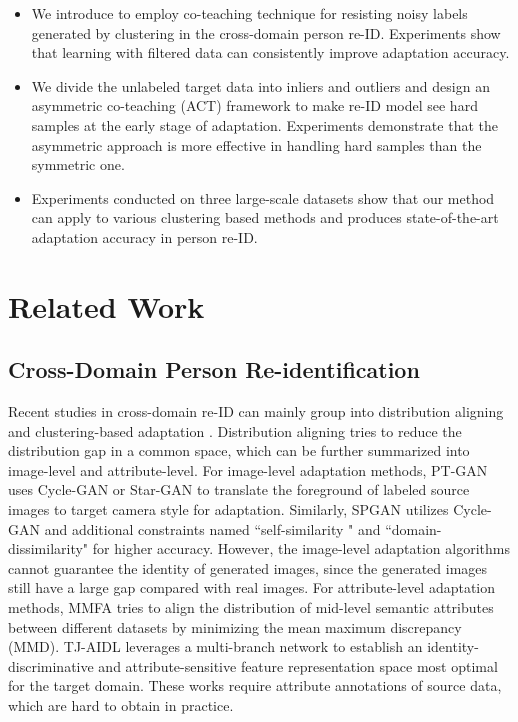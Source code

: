 \documentclass[letterpaper]{article} \usepackage{aaai20}  \usepackage{times}  \usepackage{helvet} \usepackage{courier}  \usepackage[hyphens]{url}  \usepackage{graphicx} \urlstyle{rm} \def\UrlFont{\rm}  \usepackage{graphicx}  \frenchspacing  \setlength{\pdfpagewidth}{8.5in}  \setlength{\pdfpageheight}{11in}  \usepackage{color}
\begin{document}
\begin{itemize}
    \item We introduce to employ co-teaching technique for resisting noisy labels generated by clustering in the cross-domain person re-ID. Experiments show that learning with filtered data can consistently improve adaptation accuracy.
    
    \item We divide the unlabeled target data into inliers and outliers and design an asymmetric co-teaching (ACT) framework to make re-ID model see hard samples at the early stage of adaptation. Experiments demonstrate that the asymmetric approach is more effective in handling hard samples than the symmetric one.
    
    \item{Experiments conducted on three large-scale datasets show that our method can apply to various clustering based methods and produces state-of-the-art adaptation accuracy in person re-ID.}
\end{itemize}


\section{Related Work}
\subsection{Cross-Domain Person Re-identification} 

Recent studies in cross-domain re-ID can mainly group into distribution aligning \cite{PTGAN,SPGAN,MMFA,TJAIDL} and clustering-based adaptation \cite{fan2017unsupervised,song2018unsupervised}. Distribution aligning tries to reduce the distribution gap in a common space, which can be further summarized into image-level and attribute-level. For image-level adaptation methods, PT-GAN \cite{PTGAN} uses Cycle-GAN \cite{zhu2017CycleGAN} or Star-GAN \cite{choi2017stargan} to translate the foreground of labeled source images to target camera style for adaptation. Similarly, SPGAN \cite{SPGAN} utilizes Cycle-GAN and additional constraints named ``self-similarity " and ``domain-dissimilarity" for higher accuracy. However, the image-level adaptation algorithms cannot guarantee the identity of generated images, since the generated images still have a large gap compared with real images. For attribute-level adaptation methods, MMFA \cite{MMFA} tries to align the distribution of mid-level semantic attributes between different datasets by minimizing the mean maximum discrepancy (MMD). TJ-AIDL \cite{TJAIDL} leverages a multi-branch network to establish an identity-discriminative and attribute-sensitive feature representation space most optimal for the target domain. These works require attribute annotations of source data, which are hard to obtain in practice. 
\end{document}
